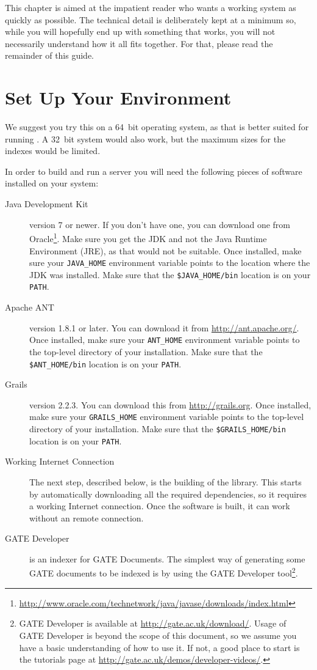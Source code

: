 This chapter is aimed at the impatient reader who wants a working system as
quickly as possible. The technical detail is deliberately kept at a minimum so,
while you will hopefully end up with something that works, you will not
necessarily understand how it all fits together. For that, please read the
remainder of this guide.

\section{Set Up Your Environment}
We suggest you try this on a 64~bit operating system, as that is better suited
for running \Mimir{}. A 32~bit system would also work, but the maximum sizes for
the indexes would be limited.

In order to build and run a \Mimir{} server you will need the following pieces
of software installed on your system:
\begin{description}
  \item[Java Development Kit] version 7 or newer. If you don't have one, you can
  download one from 
  Oracle\footnote{\url{http://www.oracle.com/technetwork/java/javase/downloads/index.html}}.
  Make sure you get the JDK and not the Java Runtime Environment (JRE), as that
  would not be suitable. Once installed, make sure your \verb!JAVA_HOME!
  environment variable points to the location where the JDK was installed.  Make
  sure that the \verb!$JAVA_HOME/bin! location is on your \verb!PATH!.
  \item[Apache ANT] version 1.8.1 or later. You can download it from
  \url{http://ant.apache.org/}. Once installed, make sure your \verb!ANT_HOME!
  environment variable points to the top-level directory of your installation.
  Make  sure that the \verb!$ANT_HOME/bin! location is on your \verb!PATH!.
  \item[Grails] version 2.2.3. You can download this from
  \url{http://grails.org}. Once installed, make sure your \verb!GRAILS_HOME!
  environment variable points to the top-level directory of your installation.
  Make sure that the \verb!$GRAILS_HOME/bin! location is on your \verb!PATH!.
  \item[Working Internet Connection] The next step, described below, is the
  building of the \Mimir{} library. This starts by automatically downloading all
  the required dependencies, so it requires a working Internet connection. Once
  the software is built, it can work without an remote connection.
  \item[GATE Developer] \Mimir{} is an indexer for GATE Documents. The simplest
  way of generating some GATE documents to be indexed is by using the GATE
  Developer tool\footnote{GATE Developer is available at
  \url{http://gate.ac.uk/download/}. Usage of GATE Developer is beyond the scope
  of this document, so we assume you have a basic understanding of how to use
  it. If not, a good place to start is the tutorials page at
  \url{http://gate.ac.uk/demos/developer-videos/}.}. 
\end{description}
%
